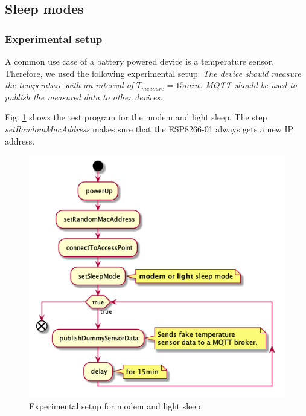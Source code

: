 \subsection{Sleep modes}

\subsubsection{Experimental setup}
A common use case of a battery powered device is a temperature sensor.
Therefore, we used the following experimental setup:
\textit{The device should measure the temperature with an interval of $T_{measure} = 15min$.
MQTT should be used to publish the measured data to other devices.}

Fig. \ref{fig:experiment_modem_light_sleep} shows the test program for the modem and light sleep.
The step \textit{setRandomMacAddress} makes sure that the ESP8266-01 always gets a new IP address.

\begin{figure}[H]
    \centering
    \includegraphics[width = 0.7 \linewidth]{fig/sequence_modem_light_sleep.png}
    \caption{Experimental setup for modem and light sleep.}
    \label{fig:experiment_modem_light_sleep}
\end{figure}

